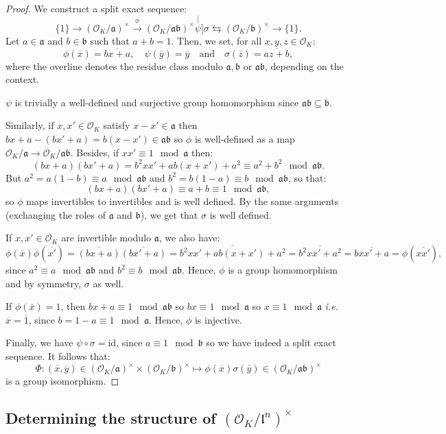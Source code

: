 \documentclass[a4paper,10pt]{report}
\theoremstyle{definition}
\theoremstyle{plain}
\theoremstyle{definition}
\newcommand{\ie}{\emph{i.e.}\ }
\newcommand{\mO}{\mathcal{O}}
\renewcommand{\(}{\left(}
\renewcommand{\)}{\right)}
\newcommand{\id}{\mbox{id}}
\newcommand{\mf}[1]{\mathfrak{#1}}
\begin{document}
\begin{proof}
We construct a split exact sequence:
\[\{1\}\longrightarrow(\mO_K/\mf{a})^\times\overset{\phi}{\longrightarrow}(\mO_K/\mf{a}\mf{b})^\times \stackrel[\psi]{\sigma}{\leftrightarrows}(\mO_K/\mf{b})^\times\longrightarrow\{1\}.\]
Let $a\in\mf{a}$ and $b\in\mf{b}$ such that $a+b=1$. Then, we set, for all $x,y,z\in\mO_K$:
\[\phi(\overline{x})=\overline{bx+a}, \quad \psi(\overline{y})=\overline{y} \quad \mbox{and} \quad \sigma(\overline{z})=\overline{az+b},\]
where the overline denotes the residue class modulo $\mf{a}, \mf{b}$ or $\mf{a}\mf{b}$, depending on the context. 

$\psi$ is trivially a well-defined and surjective group homomorphism since $\mf{a}\mf{b}\subseteq\mf{b}$. 

Similarly, if $x,x'\in\mO_K$ satisfy $x-x'\in\mf{a}$ then $bx+a-(bx'+a)=b(x-x')\in\mf{a}\mf{b}$ so $\phi$ is well-defined as a map $\mO_K/\mf{a}\longrightarrow\mO_K/\mf{a}\mf{b}$. Besides, if $xx'\equiv 1 \mod \mf{a}$ then:
\[(bx+a)(bx'+a)=b^2xx'+ab(x+x')+a^2\equiv a^2+b^2 \mod \mf{a}\mf{b}.\]
But $a^2=a(1-b)\equiv a \mod \mf{a}\mf{b}$ and $b^2=b(1-a)\equiv b \mod \mf{a}\mf{b}$, so that: 
\[(bx+a)(bx'+a)\equiv a+b\equiv 1 \mod \mf{a}\mf{b},\]
so $\phi$ maps invertibles to invertibles and is well defined. By the same arguments (exchanging the roles of $\mf{a}$ and $\mf{b}$), we get that $\sigma$ is well defined.

If $x,x'\in\mO_K$ are invertible modulo $\mf{a}$, we also have:
\[\phi(\overline{x})\phi(\overline{x'})=\overline{(bx+a)}\overline{(bx'+a)}=\overline{b^2xx'+ab(x+x')+a^2}=\overline{b^2xx'+a^2}=\overline{bxx'+a}=\phi(\overline{xx'}),\]
since $a^2\equiv a \mod \mf{a}\mf{b}$ and $b^2\equiv b \mod \mf{a}\mf{b}$. Hence, $\phi$ is a group homomorphism and by symmetry, $\sigma$ as well.

If $\phi(\overline{x})=1$, then $bx+a\equiv 1 \mod \mf{a}\mf{b}$ so $bx\equiv 1 \mod \mf{a}$ so $x\equiv 1 \mod \mf{a}$ \ie $\overline{x}=\overline{1}$, since $b=1-a\equiv 1 \mod \mf{a}$. Hence, $\phi$ is injective.

Finally, we have $\psi\circ\sigma=\id$, since $a\equiv 1 \mod \mf{b}$ so we have indeed a split exact sequence. It follows that:
\[\Phi : (\overline{x},\overline{y})\in(\mO_K/\mf{a})^\times\times (\mO_K/\mf{b})^\times\longmapsto \phi(\overline{x})\sigma(\overline{y})\in(\mO_K/\mf{a}\mf{b})^\times\]
is a group isomorphism.
\end{proof}

\subsection{Determining the structure of $(\mO_K/\mf{l}^n)^\times$}
\end{document}
